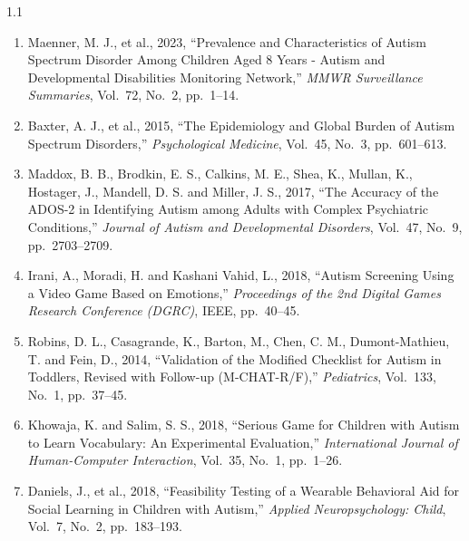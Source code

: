 \documentclass[12pt,a4paper,oneside]{report}
\begin{document}
\begin{spacing}{1.1}
\begin{enumerate}[leftmargin=0pt, itemindent=0pt, labelsep=0.5em,
                  labelwidth=1.5em, itemsep=6pt, parsep=0pt,
                  label={\arabic*.},
                  ref={\arabic*},
                  align=left]

  \setlength{\itemsep}{6pt}

  \item Maenner, M. J., et al., 2023, ``Prevalence and Characteristics of Autism Spectrum Disorder Among Children Aged 8 Years - Autism and Developmental Disabilities Monitoring Network,'' \textit{MMWR Surveillance Summaries}, Vol.~72, No.~2, pp.~1--14.

  \item Baxter, A. J., et al., 2015, ``The Epidemiology and Global Burden of Autism Spectrum Disorders,'' \textit{Psychological Medicine}, Vol.~45, No.~3, pp.~601--613.

  \item Maddox, B. B., Brodkin, E. S., Calkins, M. E., Shea, K., Mullan, K., Hostager, J., Mandell, D. S. and Miller, J. S., 2017, ``The Accuracy of the ADOS-2 in Identifying Autism among Adults with Complex Psychiatric Conditions,'' \textit{Journal of Autism and Developmental Disorders}, Vol.~47, No.~9, pp.~2703--2709.

  \item Irani, A., Moradi, H. and Kashani Vahid, L., 2018, ``Autism Screening Using a Video Game Based on Emotions,'' \textit{Proceedings of the 2nd Digital Games Research Conference (DGRC)}, IEEE, pp.~40--45.

  \item Robins, D. L., Casagrande, K., Barton, M., Chen, C. M., Dumont-Mathieu, T. and Fein, D., 2014, ``Validation of the Modified Checklist for Autism in Toddlers, Revised with Follow-up (M-CHAT-R/F),'' \textit{Pediatrics}, Vol.~133, No.~1, pp.~37--45.

  \item Khowaja, K. and Salim, S. S., 2018, ``Serious Game for Children with Autism to Learn Vocabulary: An Experimental Evaluation,'' \textit{International Journal of Human-Computer Interaction}, Vol.~35, No.~1, pp.~1--26.

  \item Daniels, J., et al., 2018, ``Feasibility Testing of a Wearable Behavioral Aid for Social Learning in Children with Autism,'' \textit{Applied Neuropsychology: Child}, Vol.~7, No.~2, pp.~183--193.


\end{enumerate}
\end{spacing}
\end{document}
